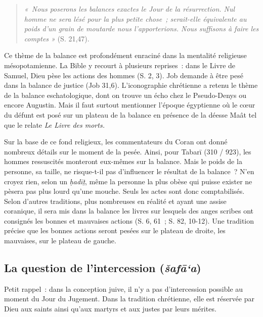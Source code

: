 \begin{quote}
\emph{«~Nous poserons les balances exactes le Jour de la résurrection.
Nul homme ne sera lésé pour la plus petite chose~; serait-elle
équivalente au poids d'un grain de moutarde nous l'apporterions. Nous
suffisons à faire les comptes »} (S. 21,47).~
\end{quote}

Ce thème de la balance est profondément enraciné dans la mentalité
religieuse mésopotamienne. La Bible y recourt à plusieurs reprises~:
dans le Livre de Samuel, Dieu pèse les actions des hommes (S. 2, 3). Job
demande à être pesé dans la balance de justice (Job 31,6).
L'iconographie chrétienne a retenu le thème de la balance
eschatologique, dont on trouve un écho chez le Pseudo-Denys ou encore
Augustin. Mais il faut surtout mentionner l'époque
égyptienne où le cœur du défunt est posé sur un plateau de la balance en
présence de la déesse Maât tel que le relate \emph{Le Livre des morts.}

Sur la base de ce fond religieux, les commentateurs du Coran ont donné
nombreux détails sur le moment de la pesée. Ainsi, pour Tabarī (310 /
923), les hommes ressuscités monteront eux-mêmes sur la balance. Mais le
poids de la personne, sa taille, ne risque-t-il pas d'influencer le
résultat de la balance~? N'en croyez rien, selon un \emph{ḥadīṯ}, même
la personne la plus obèse qui puisse exister ne pèsera pas plus lourd
qu'une mouche. Seuls les actes sont donc comptabilisés. Selon d'autres
traditions, plus nombreuses en réalité et ayant une assise coranique, il
sera mis dans la balance les livres sur lesquels des anges scribes ont
consignés les bonnes et mauvaises actions (S. 6, 61~; S. 82, 10-12). Une
tradition précise que les bonnes actions seront pesées sur le plateau de
droite, les mauvaises, sur le plateau de gauche.


\subsection{La question de l'intercession
(\emph{šafā`a})}

Petit rappel~: dans la conception juive, il n'y a pas d'intercession
possible au moment du Jour du Jugement. Dans la tradition chrétienne,
elle est réservée par Dieu aux saints ainsi qu'aux martyrs et aux justes
par leurs mérites.

